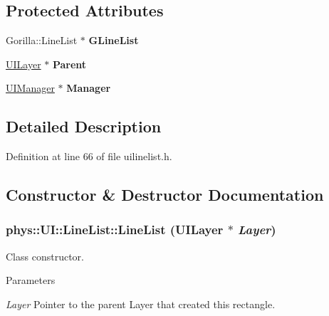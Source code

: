 \subsection*{Protected Attributes}
\begin{DoxyCompactItemize}
\item 
\hypertarget{classphys_1_1UI_1_1LineList_a54a208c0128b59d2b55887eaee077604}{
Gorilla::LineList $\ast$ {\bfseries GLineList}}
\label{d7/de8/classphys_1_1UI_1_1LineList_a54a208c0128b59d2b55887eaee077604}

\item 
\hypertarget{classphys_1_1UI_1_1LineList_a5f2c27676c660c06bb94c71f70de7546}{
\hyperlink{classphys_1_1UILayer}{UILayer} $\ast$ {\bfseries Parent}}
\label{d7/de8/classphys_1_1UI_1_1LineList_a5f2c27676c660c06bb94c71f70de7546}

\item 
\hypertarget{classphys_1_1UI_1_1LineList_a8e4a1ff5e1918871b6be7bb48c6a161d}{
\hyperlink{classphys_1_1UIManager}{UIManager} $\ast$ {\bfseries Manager}}
\label{d7/de8/classphys_1_1UI_1_1LineList_a8e4a1ff5e1918871b6be7bb48c6a161d}

\end{DoxyCompactItemize}


\subsection{Detailed Description}


Definition at line 66 of file uilinelist.h.



\subsection{Constructor \& Destructor Documentation}
\hypertarget{classphys_1_1UI_1_1LineList_a0de86be9d9ecbd6f903cc15e6f44e135}{
\subsubsection[{LineList}]{\setlength{\rightskip}{0pt plus 5cm}phys::UI::LineList::LineList ({\bf UILayer} $\ast$ {\em Layer})}}
\label{d7/de8/classphys_1_1UI_1_1LineList_a0de86be9d9ecbd6f903cc15e6f44e135}


Class constructor. 


\begin{DoxyParams}{Parameters}
\item[{\em Layer}]Pointer to the parent Layer that created this rectangle. \end{DoxyParams}


